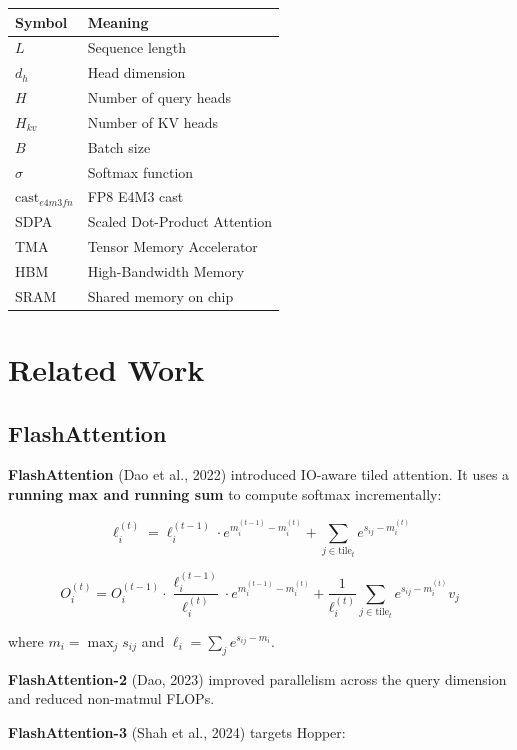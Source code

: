 \begin{table}[H]
\centering
\small
\begin{tabular}{ll}
\toprule
\textbf{Symbol} & \textbf{Meaning} \\
\midrule
$L$ & Sequence length \\
$d_h$ & Head dimension \\
$H$ & Number of query heads \\
$H_{kv}$ & Number of KV heads \\
$B$ & Batch size \\
$\sigma$ & Softmax function \\
$\text{cast}_{e4m3fn}$ & FP8 E4M3 cast \\
SDPA & Scaled Dot-Product Attention \\
TMA & Tensor Memory Accelerator \\
HBM & High-Bandwidth Memory \\
SRAM & Shared memory on chip \\
\bottomrule
\end{tabular}
\end{table}



\section{Related Work}

\subsection{FlashAttention}

\textbf{FlashAttention} (Dao et al., 2022) introduced IO-aware tiled attention. 
It uses a \textbf{running max and running sum} to compute softmax incrementally:

\[
\ell_i^{(t)} = \ell_i^{(t-1)} \cdot e^{m_i^{(t-1)} - m_i^{(t)}} + \sum_{j \in \text{tile}_t} e^{s_{ij} - m_i^{(t)}}
\tag{2.1}
\]

\[
O_i^{(t)} = O_i^{(t-1)} \cdot \frac{\ell_i^{(t-1)}}{\ell_i^{(t)}} \cdot e^{m_i^{(t-1)} - m_i^{(t)}} + \frac{1}{\ell_i^{(t)}} \sum_{j \in \text{tile}_t} e^{s_{ij} - m_i^{(t)}} v_j
\tag{2.2}
\]

where $m_i = \max_j s_{ij}$ and $\ell_i = \sum_j e^{s_{ij} - m_i}$.

\textbf{FlashAttention-2} (Dao, 2023) improved parallelism across the query 
dimension and reduced non-matmul FLOPs.

\textbf{FlashAttention-3} (Shah et al., 2024) targets Hopper:

